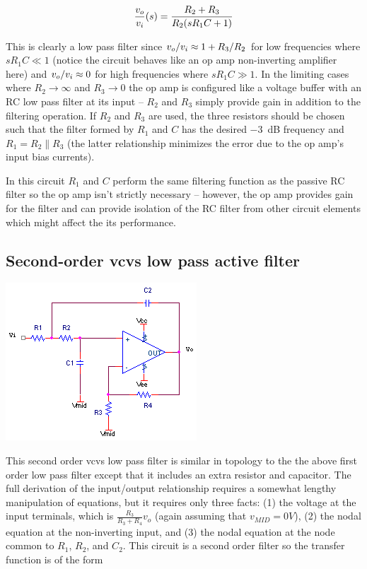 \textcolor{red}{
\begin{equation}
\frac{\vout}{\vin}(s) = \frac{R_2 + R_3}{R_2(sR_1 C + 1)}
\label{eq:1storderLPfilter}
\end{equation}
}

This is clearly a low pass filter since $\vout/\vin \approx 1 + R_3/R_2$ for low frequencies where $sR_1 C \ll 1$ (notice the circuit behaves like an op amp non-inverting amplifier here) and $\vout/\vin \approx 0$ for high frequencies where $sR_{1}C \gg 1$.
In the limiting cases where $R_2 \to \infty$ and $R_3 \to 0$ the op amp is configured like a voltage buffer with an RC low pass filter at its input -- $R_2$ and $R_3$ simply provide gain in addition to the filtering operation.
If $R_2$ and $R_3$ are used, the three resistors should be chosen such that the filter formed by $R_1$ and $C$ has the desired \SI{-3}{dB} frequency and $R_1 = R_2 \parallel R_3$ (the latter relationship minimizes the error due to the op amp's input bias currents).

In this circuit $R_1$ and $C$ perform the same filtering function as the passive RC filter so the op amp isn't strictly necessary -- however, the op amp provides gain for the filter and can provide isolation of the RC filter from other circuit elements which might affect the its performance.

\subsection{Second-order \ac{vcvs} low pass active filter}
\begin{center}
	\includegraphics{schematics/2ndorder_vcvs_LPfilter.PNG}
\end{center}
This second order \ac{vcvs} low pass filter is similar in topology to the the above first order low pass filter except that it includes an extra resistor and capacitor. The full derivation of the input/output relationship requires a somewhat lengthy manipulation of equations, but it requires only three facts: (1) the voltage at the input terminals, which is $\frac{R_{3}}{R_{3}+R_{4}}v_{o}$ (again assuming that $v_{MID} = 0V$), (2) the nodal equation at the non-inverting input, and (3) the nodal equation at the node common to $R_{1}$, $R_{2}$, and $C_{2}$. This circuit is a second order filter so the transfer function is of the form

